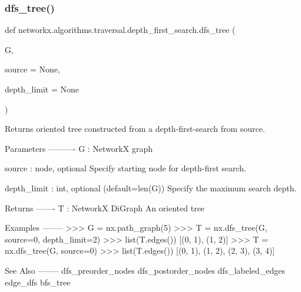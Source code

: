 \subsubsection{\texorpdfstring{dfs\+\_\+tree()}{dfs\_tree()}}
{\footnotesize\ttfamily def networkx.\+algorithms.\+traversal.\+depth\+\_\+first\+\_\+search.\+dfs\+\_\+tree (\begin{DoxyParamCaption}\item[{}]{G,  }\item[{}]{source = {\ttfamily None},  }\item[{}]{depth\+\_\+limit = {\ttfamily None} }\end{DoxyParamCaption})}

\begin{DoxyVerb}Returns oriented tree constructed from a depth-first-search from source.

Parameters
----------
G : NetworkX graph

source : node, optional
   Specify starting node for depth-first search.

depth_limit : int, optional (default=len(G))
   Specify the maximum search depth.

Returns
-------
T : NetworkX DiGraph
   An oriented tree

Examples
--------
>>> G = nx.path_graph(5)
>>> T = nx.dfs_tree(G, source=0, depth_limit=2)
>>> list(T.edges())
[(0, 1), (1, 2)]
>>> T = nx.dfs_tree(G, source=0)
>>> list(T.edges())
[(0, 1), (1, 2), (2, 3), (3, 4)]

See Also
--------
dfs_preorder_nodes
dfs_postorder_nodes
dfs_labeled_edges
edge_dfs
bfs_tree
\end{DoxyVerb}
 